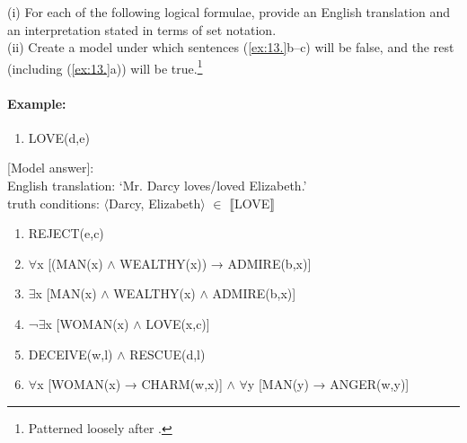 \begin{stylepoints}
(i) For each of the following logical formulae, provide an English translation and an interpretation stated in terms of set notation.\\
(ii) Create a model under which sentences (\ref{ex:13.}b--c) will be false, and the rest (including (\ref{ex:13.}a)) will be true.\footnote{Patterned loosely after \citet[350]{Saeed2009}.}
\end{stylepoints}

\paragraph{Example:}

\begin{enumerate}
\item LOVE(d,e)
\end{enumerate}

\textsf{[Model answer]:\\
English translation: ‘Mr. Darcy loves/loved Elizabeth.’\\
truth conditions:} $\langle$\textsf{Darcy, Elizabeth}$\rangle$\textsf{} ${\in}$\textsf{} $\llbracket$\textsf{LOVE}$\rrbracket$ 

\begin{enumerate}
\item REJECT(e,c)
\item ${\forall}$x [(MAN(x) $\wedge$ WEALTHY(x)) → ADMIRE(b,x)]
\item ${\exists}$x [MAN(x) $\wedge$ WEALTHY(x) $\wedge$ ADMIRE(b,x)]
\item ¬${\exists}$x [WOMAN(x) $\wedge$ LOVE(x,c)]
\item DECEIVE(w,l) $\wedge$ RESCUE(d,l)
\item ${\forall}$x [WOMAN(x) → CHARM(w,x)] $\wedge$ ${\forall}$y [MAN(y) → ANGER(w,y)]
\end{enumerate}


